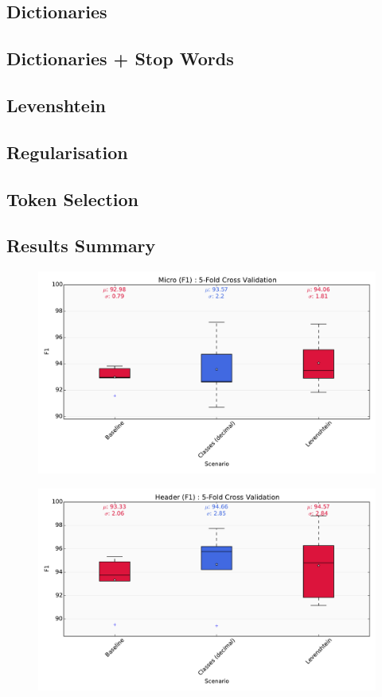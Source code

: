 \subsection{Dictionaries}

\subsection{Dictionaries + Stop Words}

\subsection{Levenshtein}

\subsection{Regularisation}

\subsection{Token Selection}

\subsection{Results Summary}

\begin{figure}[h]
\center
\includegraphics[width=5.5in]{Figures/micro.pdf}
\caption{}
\label{fig:micro}
\end{figure}

\begin{figure}[h]
\center
\includegraphics[width=5.5in]{Figures/header.pdf}
\caption{}
\label{fig:header}
\end{figure}


